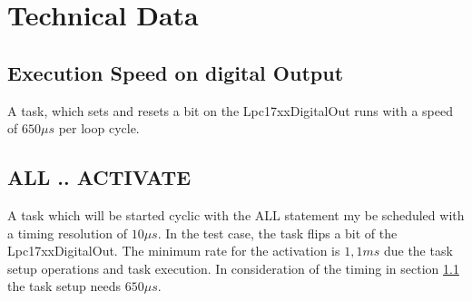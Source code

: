 \section{Technical Data}

\subsection{Execution Speed on digital Output}
\label{sec_lpc1768_bitflip}
A task, which sets and resets a bit on the Lpc17xxDigitalOut runs with
a speed of $650 \mu s$ per loop cycle.

\subsection{ALL .. ACTIVATE}
A task which will be started cyclic with the ALL statement my be scheduled 
with a timing resolution of $10 \mu s$. In the test case, the task 
flips a bit of the Lpc17xxDigitalOut. The minimum rate for the activation is 
$1,1 ms$ due the task setup operations and task execution.
In consideration of the timing in section \ref{sec_lpc1768_bitflip}
the task setup needs $650 \mu s$.


  
